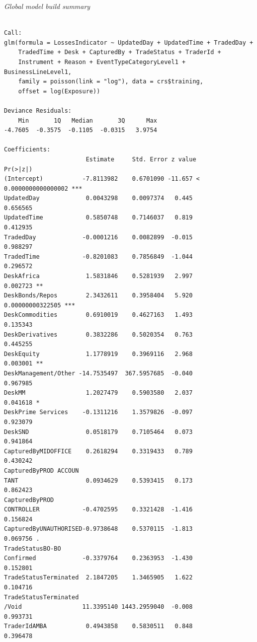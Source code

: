 \documentclass{DissertateUSU}
\begin{document}
\normalsize

\emph{Global model build summary}

\begin{verbatim}

Call:
glm(formula = LossesIndicator ~ UpdatedDay + UpdatedTime + TradedDay + 
    TradedTime + Desk + CapturedBy + TradeStatus + TraderId + 
    Instrument + Reason + EventTypeCategoryLevel1 + BusinessLineLevel1, 
    family = poisson(link = "log"), data = crs$training, 
    offset = log(Exposure))

Deviance Residuals: 
    Min       1Q   Median       3Q      Max  
-4.7605  -0.3575  -0.1105  -0.0315   3.9754  

Coefficients:
                       Estimate     Std. Error z value             Pr(>|z|)    
(Intercept)           -7.8113982    0.6701090 -11.657 < 0.0000000000000002 ***
UpdatedDay             0.0043298    0.0097374   0.445             0.656565    
UpdatedTime            0.5850748    0.7146037   0.819             0.412935    
TradedDay             -0.0001216    0.0082899  -0.015             0.988297    
TradedTime            -0.8201083    0.7856849  -1.044             0.296572    
DeskAfrica             1.5831846    0.5281939   2.997             0.002723 ** 
DeskBonds/Repos        2.3432611    0.3958404   5.920     0.00000000322505 ***
DeskCommodities        0.6910019    0.4627163   1.493             0.135343    
DeskDerivatives        0.3832286    0.5020354   0.763             0.445255    
DeskEquity             1.1778919    0.3969116   2.968             0.003001 ** 
DeskManagement/Other -14.7535497  367.5957685  -0.040             0.967985    
DeskMM                 1.2027479    0.5903580   2.037             0.041618 *  
DeskPrime Services    -0.1311216    1.3579826  -0.097             0.923079    
DeskSND                0.0518179    0.7105464   0.073             0.941864    
CapturedByMIDOFFICE    0.2618294    0.3319433   0.789             0.430242    
CapturedByPROD ACCOUN
TANT                   0.0934629    0.5393415   0.173             0.862423    
CapturedByPROD 
CONTROLLER            -0.4702595    0.3321428  -1.416             0.156824    
CapturedByUNAUTHORISED-0.9738648    0.5370115  -1.813             0.069756 .  
TradeStatusBO-BO 
Confirmed             -0.3379764    0.2363953  -1.430             0.152801    
TradeStatusTerminated  2.1847205    1.3465905   1.622             0.104716    
TradeStatusTerminated
/Void                 11.3395140 1443.2959040  -0.008             0.993731    
TraderIdAMBA           0.4943858    0.5830511   0.848             0.396478    

\end{verbatim}
\end{document}
